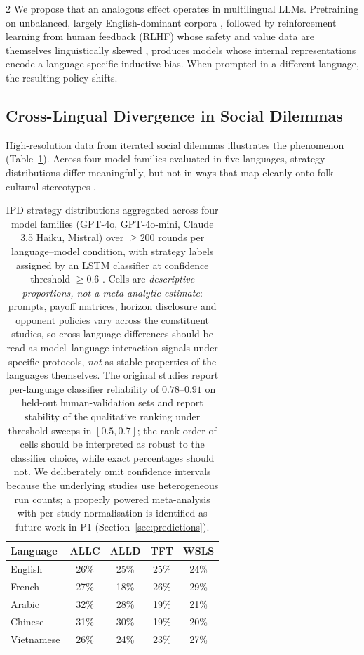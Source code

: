 \documentclass[openacc]{rsproca_new}
\begin{document}
\begin{multicols}{2}
We propose that an analogous effect operates in multilingual LLMs. Pretraining on unbalanced, largely English-dominant corpora \cite{brown2020gpt3, vaswani2017transformer}, followed by reinforcement learning from human feedback (RLHF) whose safety and value data are themselves linguistically skewed \cite{ouyang2022training, bai2022constitutional, repello2024multilingualguardrails}, produces models whose internal representations encode a language-specific inductive bias. When prompted in a different language, the resulting policy shifts.

\subsection{Cross-Lingual Divergence in Social Dilemmas}

High-resolution data from iterated social dilemmas illustrates the phenomenon (Table~\ref{tab:strategy}). Across four model families evaluated in five languages, strategy distributions differ meaningfully, but not in ways that map cleanly onto folk-cultural stereotypes \cite{huynh2026moreatstake, huynh2025fairgame, za2026towards}.

\begin{table}[H]
\centering
\small
\begin{tabular}{@{}lcccc@{}}
\toprule
\textbf{Language} & \textbf{ALLC} & \textbf{ALLD} & \textbf{TFT} & \textbf{WSLS} \\
\midrule
English & 26\% & 25\% & 25\% & 24\% \\
French & 27\% & 18\% & 26\% & 29\% \\
Arabic & 32\% & 28\% & 19\% & 21\% \\
Chinese & 31\% & 30\% & 19\% & 20\% \\
Vietnamese & 26\% & 24\% & 23\% & 27\% \\
\bottomrule
\end{tabular}
\caption{IPD strategy distributions aggregated across four model families (GPT-4o, GPT-4o-mini, Claude 3.5 Haiku, Mistral) over $\geq 200$ rounds per language--model condition, with strategy labels assigned by an LSTM classifier at confidence threshold $\geq 0.6$ \cite{huynh2026moreatstake, huynh2025fairgame, za2026towards}. Cells are \emph{descriptive proportions, not a meta-analytic estimate}: prompts, payoff matrices, horizon disclosure and opponent policies vary across the constituent studies, so cross-language differences should be read as model--language interaction signals under specific protocols, \emph{not} as stable properties of the languages themselves. The original studies report per-language classifier reliability of $0.78$--$0.91$ on held-out human-validation sets and report stability of the qualitative ranking under threshold sweeps in $[0.5, 0.7]$; the rank order of cells should be interpreted as robust to the classifier choice, while exact percentages should not. We deliberately omit confidence intervals because the underlying studies use heterogeneous run counts; a properly powered meta-analysis with per-study normalisation is identified as future work in P1 (Section~\ref{sec:predictions}).}
\label{tab:strategy}
\end{table}


\end{multicols}
\end{document}
